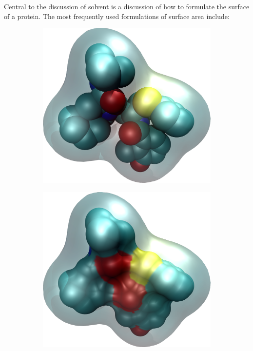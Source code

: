 Central to the discussion of solvent is a discussion of how to formulate the surface of a protein.
The most frequently used formulations of surface area include:
\begin{figure}[h!]
\centering
\begin{subfigure}[b]{0.4\textwidth}
\centering
\includegraphics[width=\textwidth]{figures/vdw.png}
\caption{}
\label{figure:vdw_surface}
\end{subfigure}
\hspace{0.1\textwidth}
\begin{subfigure}[b]{0.4\textwidth}
\centering
\includegraphics[width=\textwidth]{figures/molecular.png}

\end{subfigure}
\end{figure}
